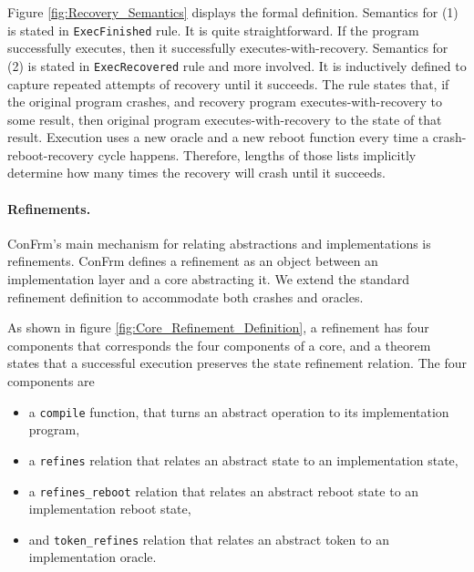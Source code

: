 Figure \ref{fig:Recovery_Semantics} displays the formal definition.
Semantics for (1) is stated in \texttt{ExecFinished} rule. It is quite straightforward. If the program successfully executes, then it successfully executes-with-recovery.
Semantics for (2) is stated in \texttt{ExecRecovered} rule and more involved. It is inductively defined to capture repeated attempts of recovery until it succeeds. The rule states that, if the original program crashes, and recovery program executes-with-recovery to some result, then original program executes-with-recovery to the state of that result. Execution uses a new oracle and a new reboot function every time a crash-reboot-recovery cycle happens. Therefore, lengths of those lists implicitly determine how many times the recovery will crash until it succeeds.

\paragraph{Refinements.}
ConFrm's main mechanism for relating abstractions and implementations is refinements. 
ConFrm defines a refinement as an object between an implementation layer and a core abstracting it. We extend the standard refinement definition to accommodate both crashes and oracles.

As shown in figure \ref{fig:Core_Refinement_Definition}, a refinement has four components that corresponds the four components of a core, and a theorem states that a successful execution preserves the state refinement relation. The four components are
\begin{itemize}
    \item a \texttt{compile} function, that turns an  abstract operation to its implementation program,
    \item a \texttt{refines} relation that relates an abstract state to an implementation state,
    \item a \texttt{refines\_reboot} relation that relates an abstract reboot state to an implementation reboot state,
    \item and  \texttt{token\_refines} relation that relates an abstract token to an implementation oracle.
\end{itemize}

